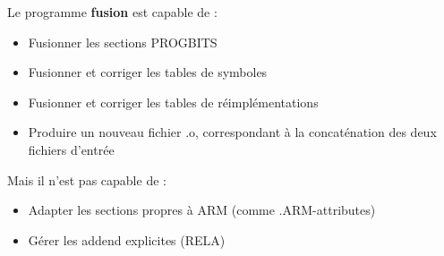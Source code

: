 \documentclass[a4paper,11pt]{article}
\begin{document}
Le programme \textbf{fusion} est capable de :
\begin{itemize}
\item Fusionner les sections PROGBITS
\item Fusionner et corriger les tables de symboles
\item Fusionner et corriger les tables de réimplémentations
\item Produire un nouveau fichier .o, correspondant à la concaténation des deux fichiers d'entrée
\end{itemize}
Mais il n'est pas capable de :
\begin{itemize}
\item Adapter les sections propres à ARM (comme .ARM-attributes)
\item Gérer les addend explicites (RELA)
\end{itemize}
\end{document}
